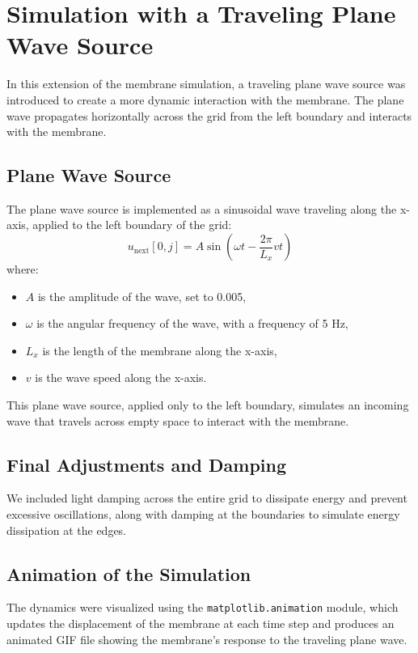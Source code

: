 \documentclass{article}
\begin{document}
\section{Simulation with a Traveling Plane Wave Source}

In this extension of the membrane simulation, a traveling plane wave source was introduced to create a more dynamic interaction with the membrane. The plane wave propagates horizontally across the grid from the left boundary and interacts with the membrane.

\subsection{Plane Wave Source}
The plane wave source is implemented as a sinusoidal wave traveling along the x-axis, applied to the left boundary of the grid:
\[
u_{\text{next}}[0, j] = A \sin\left( \omega t - \frac{2 \pi}{L_x} v t \right)
\]
where:
\begin{itemize}
    \item $A$ is the amplitude of the wave, set to 0.005,
    \item $\omega$ is the angular frequency of the wave, with a frequency of 5 Hz,
    \item $L_x$ is the length of the membrane along the x-axis,
    \item $v$ is the wave speed along the x-axis.
\end{itemize}

This plane wave source, applied only to the left boundary, simulates an incoming wave that travels across empty space to interact with the membrane.

\subsection{Final Adjustments and Damping}
We included light damping across the entire grid to dissipate energy and prevent excessive oscillations, along with damping at the boundaries to simulate energy dissipation at the edges.

\subsection{Animation of the Simulation}
The dynamics were visualized using the \texttt{matplotlib.animation} module, which updates the displacement of the membrane at each time step and produces an animated GIF file showing the membrane’s response to the traveling plane wave.
\end{document}
